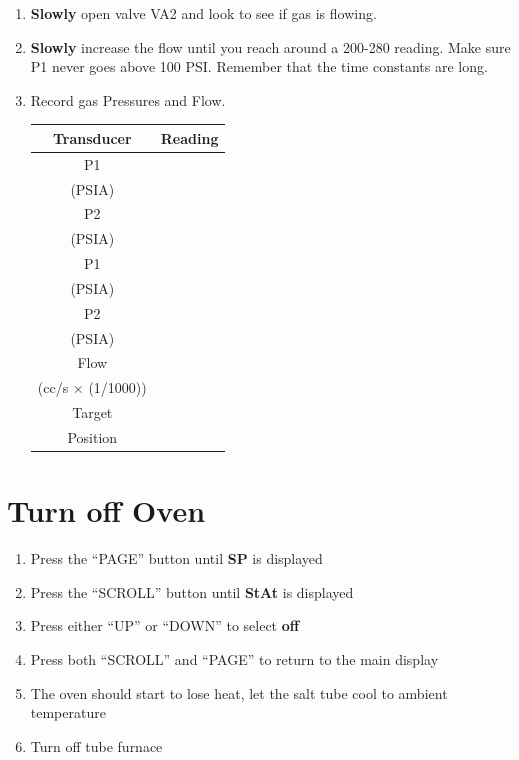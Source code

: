 \begin{enumerate}
\item \CheckBox[name=gflow28]{} {\bf Slowly} open valve VA2 and look to see if gas is flowing.
\item \CheckBox[name=gflow29]{} {\bf Slowly} increase the flow until you reach around a 200-280
  reading. Make sure P1 never goes above 100 PSI. Remember that the
  time constants are long.
\item \CheckBox[name=gflow30]{} Record gas Pressures and Flow.
\begin{center}
\begin{tabular}{|c|c|}
\hline
Transducer & Reading \\
\hline
P1 & \\
(PSIA) & \\
\hline
P2 & \\
(PSIA) & \\
\hline
P1 & \\
(PSIA) & \\
\hline
P2 & \\
(PSIA) & \\
\hline
Flow & \\
(cc/s $\times$ (1/1000)) & \\
\hline
Target & \\
Position & \\
\end{tabular}
\end{center}
  
\end{enumerate}

\section{Turn off Oven}
\begin{enumerate}
\item \CheckBox[name=ofov1]{} {Press the “PAGE” button until \textbf{SP} is displayed }
\item \CheckBox[name=ofov2]{} {Press the “SCROLL” button until \textbf{StAt} is displayed}
\item \CheckBox[name=ofov3]{} {Press either “UP” or “DOWN”  to select \textbf{off} }
\item \CheckBox[name=ofov4]{} {Press both “SCROLL” and “PAGE” to return to the main display  }
\item \CheckBox[name=ofov5]{} {The oven should start to lose heat, let the salt tube cool to ambient temperature}
\item \CheckBox[name=ofov6]{} {Turn off tube furnace}
\end{enumerate}


